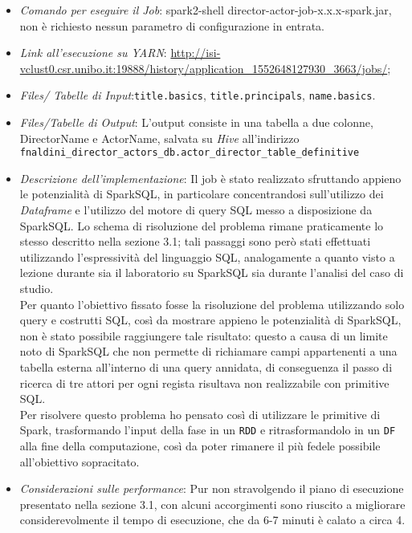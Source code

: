 \documentclass[hidelinks]{article}
\begin{document}
\begin{itemize}
	\item \textit{Comando per eseguire il Job}: spark2-shell director-actor-job-x.x.x-spark.jar, non è richiesto nessun parametro di configurazione in entrata.
	\item \textit{Link all'esecuzione su YARN}:
	\url{http://isi-vclust0.csr.unibo.it:19888/history/application_1552648127930_3663/jobs/}; 
	
	\item \textit{Files/ Tabelle di Input}:\texttt{title.basics}, \texttt{title.principals}, \texttt{name.basics}.
	\item \textit{Files/Tabelle di Output}: L'output consiste in una tabella a due colonne, DirectorName e ActorName, salvata su \textit{Hive} all'indirizzo\\  \texttt{fnaldini\_director\_actors\_db.actor\_director\_table\_definitive}
	\item \textit{Descrizione dell'implementazione}: Il job è stato realizzato sfruttando appieno le potenzialità di SparkSQL, in particolare concentrandosi sull'utilizzo dei \textit{Dataframe} e l'utilizzo del motore di query SQL messo a disposizione da SparkSQL.
	Lo schema di risoluzione del problema rimane praticamente lo stesso descritto nella sezione 3.1; tali passaggi sono però stati effettuati utilizzando l'espressività del linguaggio SQL, analogamente a quanto visto a lezione durante sia il laboratorio su SparkSQL sia durante l'analisi del caso di studio.\\
	Per quanto l'obiettivo fissato fosse la risoluzione del problema utilizzando solo query e costrutti SQL, così da mostrare appieno le potenzialità di SparkSQL, non è stato possibile raggiungere tale risultato: questo a causa di un limite noto di SparkSQL che non permette di richiamare campi appartenenti a una tabella esterna all'interno di una query annidata, di conseguenza il passo di ricerca di tre attori per ogni regista risultava non realizzabile con primitive SQL.\\
	Per risolvere questo problema ho pensato così di utilizzare le primitive di Spark, trasformando l'input della fase in un \texttt{RDD} e ritrasformandolo in un \texttt{DF} alla fine della computazione, così da poter rimanere il più fedele possibile all'obiettivo sopracitato.
	
	\item \textit{Considerazioni sulle performance}: Pur non stravolgendo il piano di esecuzione presentato nella sezione 3.1, con alcuni accorgimenti sono riuscito a migliorare considerevolmente il tempo di esecuzione, che da 6-7 minuti è calato a circa 4.
	

\end{itemize}
\end{document}
